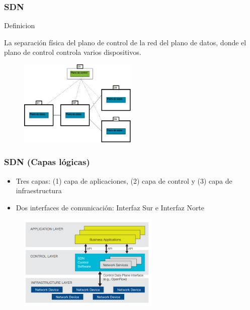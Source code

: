 \documentclass{beamer}
\begin{document}
\begin{frame}
\frametitle{SDN} 

\begin{block}{Definicion}

La separación física del plano de control de la red del plano de datos, donde el plano
de control controla varios dispositivos.

\end{block}

	\begin{figure}[H]
		\raggedright
		\includegraphics[width=0.5\textwidth, center]{imagenes/SDN-distribuido.png}
	\end{figure}

\end{frame}

\begin{frame}
\frametitle{SDN (Capas l\'ogicas)} 

\begin{itemize}
\item Tres capas: (1) capa de aplicaciones, (2) capa de control y (3) capa de infraestructura
\item Dos interfaces de comunicaci\'on: Interfaz Sur e Interfaz Norte
\end{itemize}
 

\begin{figure}[H]
\centering
\includegraphics[width=0.6\textwidth]{imagenes/SDNArchitecture.png}
\end{figure}
\end{frame}
\end{document}
